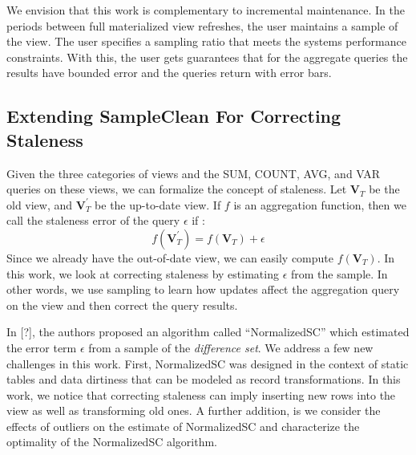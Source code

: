 We envision that this work is complementary to incremental maintenance.
In the periods between full materialized view refreshes, the user maintains a sample of the view. 
The user specifies a sampling ratio that meets the systems performance constraints.
With this, the user gets guarantees that for the aggregate queries the results have bounded error and 
the queries return with error bars.

\subsection{Extending SampleClean For Correcting Staleness}
Given the three categories of views and the SUM, COUNT, AVG, and VAR
queries on these views, we can formalize the concept of staleness.
Let $\textbf{V}_{T}$ be the old view, and $\textbf{V}_{T}^{'}$ be
the up-to-date view. If $f$ is an aggregation function, then we call
the staleness error of the query $\epsilon$ if :
\[
f(\textbf{V}_{T}^{'})=f(\textbf{V}_{T})+\epsilon
\]
Since we already have the out-of-date view, we can easily compute
$f(\textbf{V}_{T})$. 
In this work, we look at correcting staleness by estimating $\epsilon$ 
from the sample.
In other words, we use sampling to learn how updates affect the aggregation query on the view
and then correct the query results.

In {[}?{]}, the authors proposed an algorithm called ``NormalizedSC'' 
which estimated the error term $\epsilon$ from a sample of the \emph{difference set}.
We address a few new challenges in this work. First, NormalizedSC
was designed in the context of static tables and data dirtiness that
can be modeled as record transformations. 
In this work, we notice that correcting staleness can imply inserting new rows 
into the view as well as transforming old ones.
A further addition, is we consider the effects of outliers
on the estimate of NormalizedSC and characterize the optimality of
the NormalizedSC algorithm.



